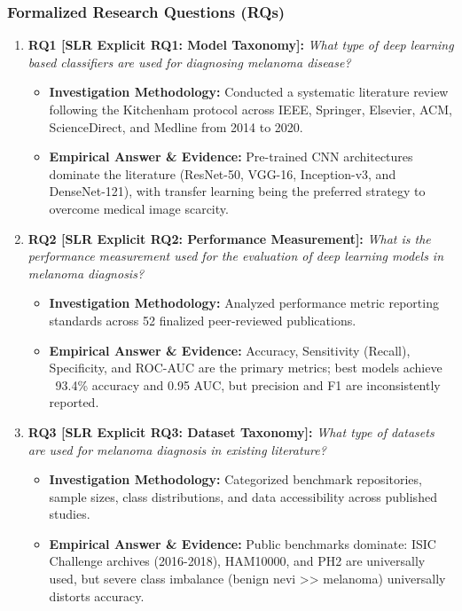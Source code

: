 \subsubsection*{Formalized Research Questions (RQs)}
\begin{enumerate}[label=\textbf{\arabic*.}, leftmargin=*]
  \item \textbf{RQ1 [SLR Explicit RQ1: Model Taxonomy]:} \textit{What type of deep learning based classifiers are used for diagnosing melanoma disease?}
  \begin{itemize}[leftmargin=1.5em]
    \item \textbf{Investigation Methodology:} Conducted a systematic literature review following the Kitchenham protocol across IEEE, Springer, Elsevier, ACM, ScienceDirect, and Medline from 2014 to 2020.
    \item \textbf{Empirical Answer \& Evidence:} Pre-trained CNN architectures dominate the literature (ResNet-50, VGG-16, Inception-v3, and DenseNet-121), with transfer learning being the preferred strategy to overcome medical image scarcity.
  \end{itemize}
  \item \textbf{RQ2 [SLR Explicit RQ2: Performance Measurement]:} \textit{What is the performance measurement used for the evaluation of deep learning models in melanoma diagnosis?}
  \begin{itemize}[leftmargin=1.5em]
    \item \textbf{Investigation Methodology:} Analyzed performance metric reporting standards across 52 finalized peer-reviewed publications.
    \item \textbf{Empirical Answer \& Evidence:} Accuracy, Sensitivity (Recall), Specificity, and ROC-AUC are the primary metrics; best models achieve ~93.4\% accuracy and 0.95 AUC, but precision and F1 are inconsistently reported.
  \end{itemize}
  \item \textbf{RQ3 [SLR Explicit RQ3: Dataset Taxonomy]:} \textit{What type of datasets are used for melanoma diagnosis in existing literature?}
  \begin{itemize}[leftmargin=1.5em]
    \item \textbf{Investigation Methodology:} Categorized benchmark repositories, sample sizes, class distributions, and data accessibility across published studies.
    \item \textbf{Empirical Answer \& Evidence:} Public benchmarks dominate: ISIC Challenge archives (2016-2018), HAM10000, and PH2 are universally used, but severe class imbalance (benign nevi >> melanoma) universally distorts accuracy.

\end{itemize}
\end{enumerate}
